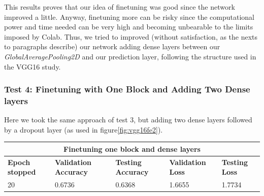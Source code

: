 This results proves that our idea of finetuning was good since the network improved a little. Anyway, finetuning more can be risky since the computational power and time needed can be very high and becoming unbearable to the limits imposed by Colab. Thus, we tried to improved (without satisfaction, as the nexts to paragraphs describe) our network adding dense layers between our \textit{GlobalAveragePooling2D} and our prediction layer, following the structure used in the VGG16 study.



\subsubsection{Test 4: Finetuning with One Block and Adding Two Dense layers}
Here we took the same approach of test 3, but adding two dense layers followed by a dropout layer (as used in figure\ref{fig:vgg16fe2}).

\medskip

\begin{tabular}{ |p{2cm}|p{2cm}|p{2cm}|p{2cm}|p{2cm}|  }
\hline
\multicolumn{5}{|c|}{Finetuning one block and dense layers} \\
\hline
\textbf{Epoch stopped} & \textbf{Validation Accuracy} & \textbf{Testing Accuracy} & \textbf{Validation Loss} & \textbf{Testing Loss} \\
\hline
20 & 0.6736 & 0.6368 & 1.6655 & 1.7734\\
\hline
\end{tabular}

